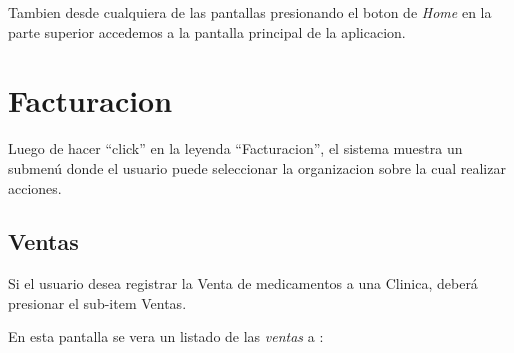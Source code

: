 \documentclass[a4paper,10pt,spanish]{sphinxmanual}
\begin{document}

Tambien desde cualquiera de las pantallas presionando el boton de \emph{Home} en la parte superior accedemos a la pantalla principal de la aplicacion.



\chapter{Facturacion}
\label{facturacion:facturacion}\label{facturacion::doc}
Luego de hacer “click” en  la leyenda ``Facturacion'', el sistema muestra un submenú donde el usuario puede seleccionar la organizacion sobre la cual realizar acciones.


\section{Ventas}
\label{ventas::doc}\label{ventas:ventas}
Si el usuario desea registrar la Venta de medicamentos a una Clinica, deberá presionar el sub-item Ventas.


En esta pantalla se vera un listado de las \emph{ventas} a :

\end{document}
